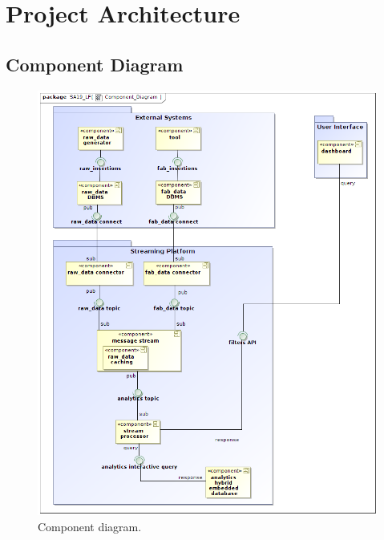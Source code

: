\chapter{Project Architecture}
\section{Component Diagram}
\pagebreak
 \begin{figure}[H]
\centering
 \includegraphics[width=\textwidth, height=\textheight]{img/Component_Diagram.png}
\caption{Component diagram.}
\end{figure}


